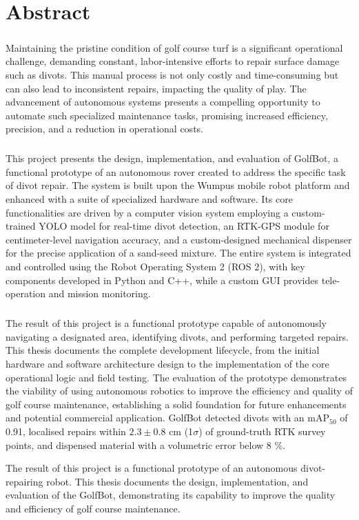 \chapter*{Abstract}


    \paragraph{} 
    Maintaining the pristine condition of golf course turf is a significant operational challenge, demanding constant, labor-intensive efforts to repair surface damage such as divots. This manual process is not only costly and time-consuming but can also lead to inconsistent repairs, impacting the quality of play. The advancement of autonomous systems presents a compelling opportunity to automate such specialized maintenance tasks, promising increased efficiency, precision, and a reduction in operational costs.
    
    \paragraph{}
    This project presents the design, implementation, and evaluation of GolfBot, a functional prototype of an autonomous rover created to address the specific task of divot repair. The system is built upon the Wumpus mobile robot platform and enhanced with a suite of specialized hardware and software. Its core functionalities are driven by a computer vision system employing a custom-trained YOLO model for real-time divot detection, an RTK-GPS module for centimeter-level navigation accuracy, and a custom-designed mechanical dispenser for the precise application of a sand-seed mixture. The entire system is integrated and controlled using the Robot Operating System 2 (ROS 2), with key components developed in Python and C++, while a custom GUI provides tele-operation and mission monitoring.

    \paragraph{} 
    The result of this project is a functional prototype capable of autonomously navigating a designated area, identifying divots, and performing targeted repairs. This thesis documents the complete development lifecycle, from the initial hardware and software architecture design to the implementation of the core operational logic and field testing. The evaluation of the prototype demonstrates the viability of using autonomous robotics to improve the efficiency and quality of golf course maintenance, establishing a solid foundation for future enhancements and potential commercial application. GolfBot detected divots with an mAP$_{50}$ of 0.91, localised repairs within $2.3\pm0.8$ cm (1$\sigma$) of ground-truth RTK survey points, and dispensed material with a volumetric error below 8 \%.
     

The result of this project is a functional prototype of an autonomous divot-repairing robot. This thesis documents the design, implementation, and evaluation of the GolfBot, demonstrating its capability to improve the quality and efficiency of golf course maintenance.
